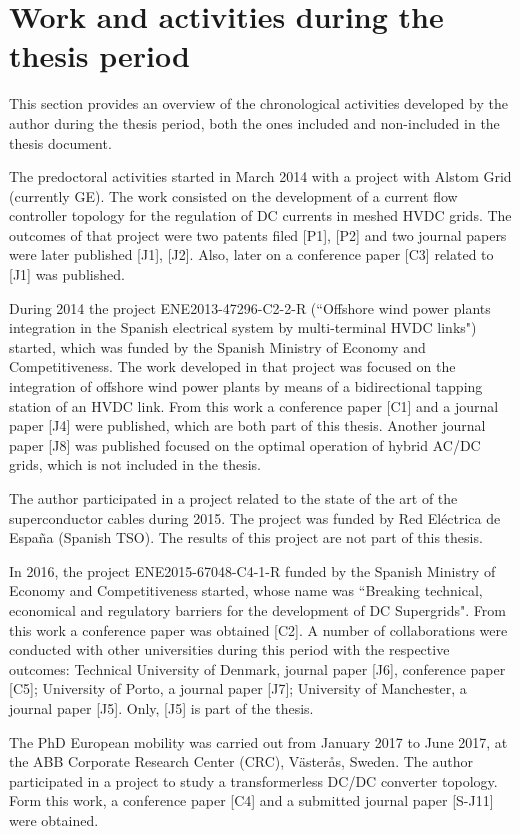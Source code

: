 \newpage 
	\section{Work and activities during the thesis period}
	
	This section provides an overview of the chronological activities developed by the author during the thesis period, both the ones included and non-included in the thesis document.
	
	The predoctoral activities started in March 2014 with a project with Alstom Grid (currently GE). The work consisted on the development of a current flow controller topology for the regulation of DC currents in meshed HVDC grids. The outcomes of that project were two patents filed [P1], [P2] and two journal papers were later published [J1], [J2]. Also, later on a conference paper [C3] related to [J1] was published.
	
	During 2014 the project ENE2013-47296-C2-2-R (``Offshore wind power plants integration in the Spanish electrical system by multi-terminal HVDC links") started, which was funded by the Spanish Ministry of Economy and Competitiveness. The work developed in that project was focused on the integration of offshore wind power plants by means of a bidirectional tapping station of an HVDC link. From this work a conference paper [C1] and a journal paper [J4] were published, which are both part of this thesis. Another journal paper [J8] was published focused on the optimal operation of hybrid AC/DC grids, which is not included in the thesis.
	
	The author participated in a project related to the state of the art of the superconductor cables during 2015. The project was funded by Red El\'{e}ctrica de Espa\~{n}a (Spanish TSO). The results of this project are not part of this thesis.
		 
	In 2016, the project ENE2015-67048-C4-1-R funded by the Spanish Ministry of Economy and Competitiveness started, whose name was ``Breaking technical, economical and regulatory barriers for the development of DC Supergrids". From this work a conference paper was obtained [C2].
	A number of collaborations were conducted with other universities during this period with the respective outcomes: Technical University of Denmark, journal paper [J6], conference paper [C5]; University of Porto, a journal paper [J7]; University of Manchester, a journal paper [J5]. Only, [J5] is part of the thesis. 
	
	The PhD European mobility was carried out from January 2017 to June 2017, at the ABB Corporate Research Center (CRC), V\"{a}ster\r{a}s, Sweden. The author participated in a project to study a transformerless DC/DC converter topology. Form this work, a conference paper [C4] and a submitted journal paper [S-J11] were obtained. 
	
